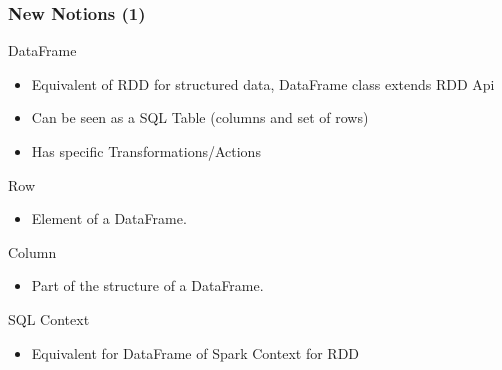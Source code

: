 \documentclass[slidetop,9pt,utf8]{beamer}
\begin{document}
\begin{frame}
  \frametitle{New Notions (1)}

  \begin{block}{DataFrame}
    \begin{itemize}
      \item Equivalent of RDD for structured data, DataFrame class extends RDD Api
      \item Can be seen as a SQL Table (columns and set of rows)
      \item Has specific Transformations/Actions
    \end{itemize}
  \end{block}

  \begin{block}{Row}
    \begin{itemize}
      \item Element of a DataFrame.
    \end{itemize}
  \end{block}

  \begin{block}{Column}
    \begin{itemize}
      \item Part of the structure of a DataFrame.
    \end{itemize}
  \end{block}

  \begin{block}{SQL Context}
    \begin{itemize}
      \item Equivalent for DataFrame of Spark Context for RDD
    \end{itemize}
  \end{block}

\end{frame}
\end{document}
